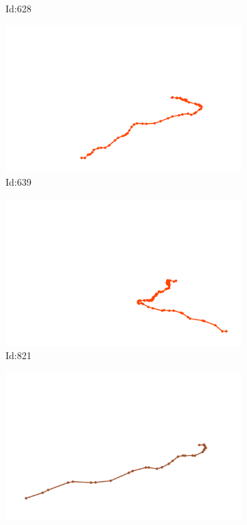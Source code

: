 \documentclass[12pt,twoside]{report}
\begin{document}
\begin{figure}
\begin{subfigure}[b]{0.20\textwidth}
\caption{Id:628}
\end{subfigure}
\begin{subfigure}[b]{0.20\textwidth}
\centering
\includegraphics[width=\textwidth]{../trajectories/639.png}
\caption{Id:639}
\end{subfigure}
\begin{subfigure}[b]{0.20\textwidth}
\centering
\includegraphics[width=\textwidth]{../trajectories/821.png}
\caption{Id:821}
\end{subfigure}
\begin{subfigure}[b]{0.20\textwidth}
\centering
\includegraphics[width=\textwidth]{../trajectories/852.png}

\end{subfigure}
\end{figure}
\end{document}
